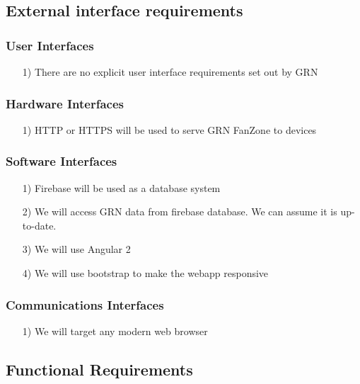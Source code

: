 \documentclass[10pt,a4paper]{article}
\begin{document}
\subsection{External interface requirements}

\subsubsection{User Interfaces}
\begin{itemize}
\item[1)]
There are no explicit user interface requirements set out by GRN
\end{itemize}

\subsubsection{Hardware Interfaces}
\begin{itemize}
\item[1)]
HTTP or HTTPS will be used to serve GRN FanZone to devices
\end{itemize}

\subsubsection{Software Interfaces}
\begin{itemize}
\item[1)]
Firebase will be used as a database system

\item[2)]
We will access GRN data from firebase database. We can assume it is up-to-date.


\item[3)]
We will use Angular 2

\item[4)]
We will use bootstrap to make the webapp responsive
\end{itemize}

\subsubsection{Communications Interfaces}
\begin{itemize}
\item[1)]
We will target any modern web browser 
\end{itemize}

\subsection{Functional Requirements}
\end{document}
